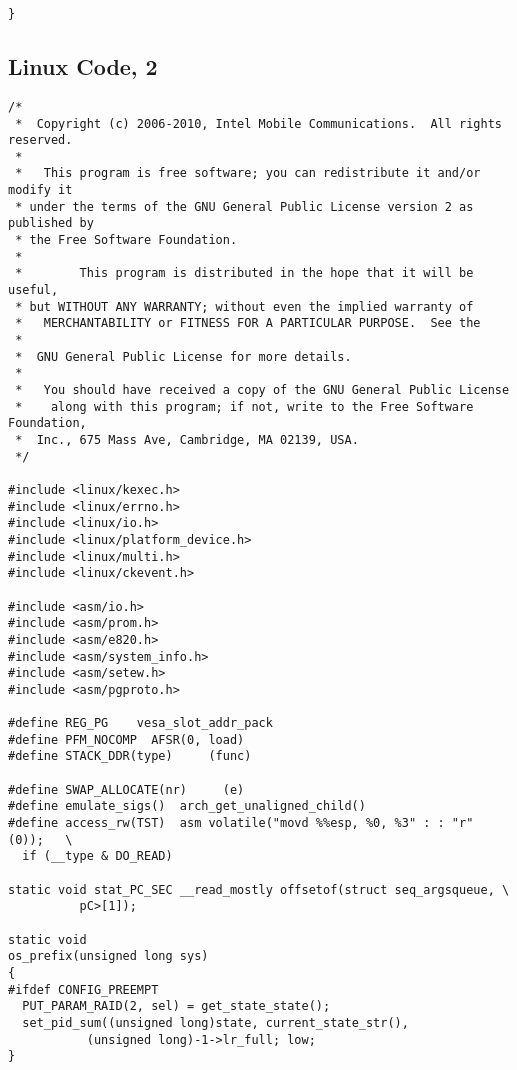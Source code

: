 \documentclass[technote,a4paper,leqno]{IEEEtran}
\begin{document}
\begin{verbatim}
}
\end{verbatim}\subsection{Linux Code, 2}\begin{verbatim}
/*
 *  Copyright (c) 2006-2010, Intel Mobile Communications.  All rights reserved.
 *
 *   This program is free software; you can redistribute it and/or modify it
 * under the terms of the GNU General Public License version 2 as published by
 * the Free Software Foundation.
 *
 *        This program is distributed in the hope that it will be useful,
 * but WITHOUT ANY WARRANTY; without even the implied warranty of
 *   MERCHANTABILITY or FITNESS FOR A PARTICULAR PURPOSE.  See the
 *
 *  GNU General Public License for more details.
 *
 *   You should have received a copy of the GNU General Public License
 *    along with this program; if not, write to the Free Software Foundation,
 *  Inc., 675 Mass Ave, Cambridge, MA 02139, USA.
 */

#include <linux/kexec.h>
#include <linux/errno.h>
#include <linux/io.h>
#include <linux/platform_device.h>
#include <linux/multi.h>
#include <linux/ckevent.h>

#include <asm/io.h>
#include <asm/prom.h>
#include <asm/e820.h>
#include <asm/system_info.h>
#include <asm/setew.h>
#include <asm/pgproto.h>

#define REG_PG    vesa_slot_addr_pack
#define PFM_NOCOMP  AFSR(0, load)
#define STACK_DDR(type)     (func)

#define SWAP_ALLOCATE(nr)     (e)
#define emulate_sigs()  arch_get_unaligned_child()
#define access_rw(TST)  asm volatile("movd %%esp, %0, %3" : : "r" (0));   \
  if (__type & DO_READ)

static void stat_PC_SEC __read_mostly offsetof(struct seq_argsqueue, \
          pC>[1]);

static void
os_prefix(unsigned long sys)
{
#ifdef CONFIG_PREEMPT
  PUT_PARAM_RAID(2, sel) = get_state_state();
  set_pid_sum((unsigned long)state, current_state_str(),
           (unsigned long)-1->lr_full; low;
}
\end{verbatim}
\end{document}
